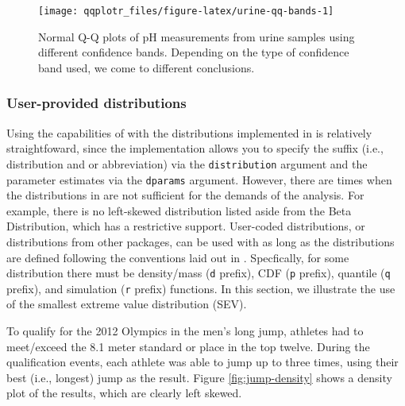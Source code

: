 \begin{Schunk}
\begin{figure}

{\centering \texttt{[image: qqplotr\_files/figure-latex/urine-qq-bands-1]} 

}

\caption[Normal Q-Q plots of pH measurements from urine samples using different confidence bands]{Normal Q-Q plots of pH measurements from urine samples using different confidence bands. Depending on the type of confidence band used, we come to different conclusions.}\label{fig:urine-qq-bands}
\end{figure}
\end{Schunk}

\FloatBarrier

\subsubsection{User-provided
distributions}\label{user-provided-distributions}

\label{sec:user-dists}

Using the capabilities of  with the distributions
implemented in  is relatively straightfoward, since the
implementation allows you to specify the suffix (i.e., distribution and
or abbreviation) via the \texttt{distribution} argument and the
parameter estimates via the \texttt{dparams} argument. However, there
are times when the distributions in  are not sufficient for
the demands of the analysis. For example, there is no left-skewed
distribution listed aside from the Beta Distribution, which has a
restrictive support. User-coded distributions, or distributions from
other packages, can be used with  as long as the
distributions are defined following the conventions laid out in
. Specfically, for some distribution there must be
density/mass (\texttt{d} prefix), CDF (\texttt{p} prefix), quantile
(\texttt{q} prefix), and simulation (\texttt{r} prefix) functions. In
this section, we illustrate the use of the smallest extreme value
distribution (SEV).

To qualify for the 2012 Olympics in the men's long jump, athletes had to
meet/exceed the 8.1 meter standard or place in the top twelve. During
the qualification events, each athlete was able to jump up to three
times, using their best (i.e., longest) jump as the result. Figure
\ref{fig:jump-density} shows a density plot of the results, which are
clearly left skewed.


